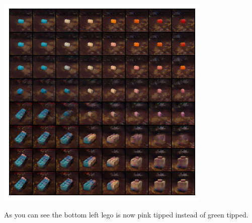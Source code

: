 \documentclass[]{article}
\begin{document}
\begin{center}
\includegraphics[scale=1.2]{./imgs/seed_69,0,23,42,62_interpolation}
\end{center}
As you can see the bottom left lego is now pink tipped instead of green tipped.
\end{document}
